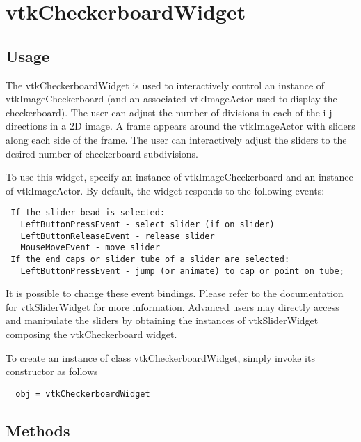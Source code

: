 \section{vtkCheckerboardWidget}

\subsection{Usage}

 The vtkCheckerboardWidget is used to interactively control an instance of
 vtkImageCheckerboard (and an associated vtkImageActor used to display the
 checkerboard). The user can adjust the number of divisions in each of the
 i-j directions in a 2D image. A frame appears around the vtkImageActor
 with sliders along each side of the frame. The user can interactively
 adjust the sliders to the desired number of checkerboard subdivisions.
 
 To use this widget, specify an instance of vtkImageCheckerboard and an
 instance of vtkImageActor. By default, the widget responds to the
 following events:
 \begin{verbatim}
 If the slider bead is selected:
   LeftButtonPressEvent - select slider (if on slider)
   LeftButtonReleaseEvent - release slider 
   MouseMoveEvent - move slider
 If the end caps or slider tube of a slider are selected:
   LeftButtonPressEvent - jump (or animate) to cap or point on tube;
 \end{verbatim}
 It is possible to change these event bindings. Please refer to the
 documentation for vtkSliderWidget for more information. Advanced users may
 directly access and manipulate the sliders by obtaining the instances of
 vtkSliderWidget composing the vtkCheckerboard widget. 

To create an instance of class vtkCheckerboardWidget, simply
invoke its constructor as follows
\begin{verbatim}
  obj = vtkCheckerboardWidget
\end{verbatim}
\subsection{Methods}

